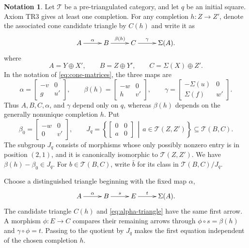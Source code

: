 \documentclass[a4paper,11pt,reqno]{amsart}
\theoremstyle{definition}
\newtheorem{notation}[notation]{Notation}
\theoremstyle{plain}
\numberwithin{equation}{section}
\newcommand{\T}{\mathcal T}
\begin{document}
\begin{notation}
\label{not:cone-data}
Let $\T$ be a pre-triangulated category, and let $q$ be an
initial square.  Axiom $\mathrm{TR3}$ gives at least one completion.  For any
completion $h:Z\to Z'$, denote the associated cone candidate triangle by $C(h)$ and
write it as
\begin{equation}
\label{eq:local-cone}
\xymatrix@C=2.2pc{
A\ar[r]^-{\alpha}&B\ar[r]^-{\beta(h)}&C\ar[r]^-{\gamma}&\Sigma(A).
}
\end{equation}
where
\[
 A=Y\oplus X',\qquad B=Z\oplus Y',\qquad
 C=\Sigma(X)\oplus Z'.
\]
In the notation of \eqref{eq:cone-matrices}, the three maps are
\[
 \alpha=\begin{bmatrix}-v&0\\ g&u'\end{bmatrix},\qquad
 \beta(h)=\begin{bmatrix}-w&0\\ h&v'\end{bmatrix},\qquad
 \gamma=\begin{bmatrix}-\Sigma(u)&0\\ \Sigma(f)&w'\end{bmatrix}.
\]
Thus $A,B,C,\alpha$, and $\gamma$ depend only on $q$, whereas $\beta(h)$
depends on the generally nonunique completion $h$.  Put
\[
 \beta_0=
 \begin{bmatrix}-w&0\\0&v'\end{bmatrix},
 \qquad
 J_q=\left\{
 \begin{bmatrix}0&0\\a&0\end{bmatrix}
 \,\middle|\,a\in\T(Z,Z')
 \right\}\subseteq\T(B,C).
\]
The subgroup $J_q$ consists of morphisms whose only possibly nonzero entry
is in position $(2,1)$, and it is canonically isomorphic to $\T(Z,Z')$.  We have $\beta(h)-\beta_0\in J_q$.  For $b\in\T(B,C)$,
write $\bar b$ for its class in $\T(B,C)/J_q$.
\end{notation}

Choose a distinguished triangle beginning with the fixed map $\alpha$,
\begin{equation}
\label{eq:alpha-triangle}
\xymatrix@C=2.2pc{
A\ar[r]^-{\alpha}&B\ar[r]^-{s}&E\ar[r]^-{t}&\Sigma(A).
}
\end{equation}
The candidate triangle $C(h)$ and \eqref{eq:alpha-triangle} have the same first
arrow.  A morphism $\phi:E\to C$ compares their remaining arrows through
$\phi\circ s=\beta(h)$ and $\gamma\circ\phi=t$.  Passing to the quotient
by \(J_q\) makes the first equation independent of the chosen completion
\(h\).
\end{document}
